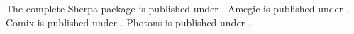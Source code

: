 \documentclass{article}
\begin{document}
The complete Sherpa package is published under \cite{Gleisberg:2008ta}.
Amegic is published under \cite{Krauss:2001iv}.
Comix is published under \cite{Gleisberg:2008fv}.
Photons is published under \cite{Schonherr:2008av}.
\end{document}
